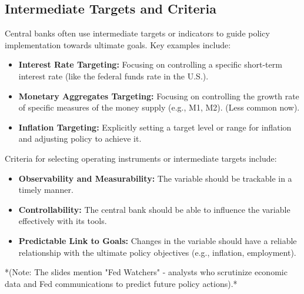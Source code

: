 \subsection{Intermediate Targets and Criteria}
Central banks often use intermediate targets or indicators to guide policy implementation towards ultimate goals. Key examples include:
\begin{itemize}
    \item \textbf{Interest Rate Targeting:} Focusing on controlling a specific short-term interest rate (like the federal funds rate in the U.S.).
    \item \textbf{Monetary Aggregates Targeting:} Focusing on controlling the growth rate of specific measures of the money supply (e.g., M1, M2). (Less common now).
    \item \textbf{Inflation Targeting:} Explicitly setting a target level or range for inflation and adjusting policy to achieve it.
\end{itemize}
Criteria for selecting operating instruments or intermediate targets include:
\begin{itemize}
    \item \textbf{Observability and Measurability:} The variable should be trackable in a timely manner.
    \item \textbf{Controllability:} The central bank should be able to influence the variable effectively with its tools.
    \item \textbf{Predictable Link to Goals:} Changes in the variable should have a reliable relationship with the ultimate policy objectives (e.g., inflation, employment).
\end{itemize}
*(Note: The slides mention "Fed Watchers" - analysts who scrutinize economic data and Fed communications to predict future policy actions).*

